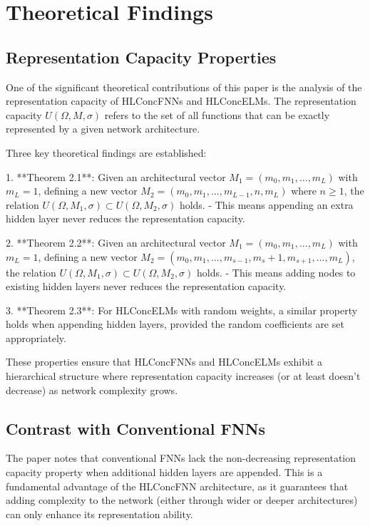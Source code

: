 \documentclass[11pt,a4paper]{article}
\begin{document}
\section{Theoretical Findings}

\subsection{Representation Capacity Properties}

One of the significant theoretical contributions of this paper is the analysis of the representation capacity of HLConcFNNs and HLConcELMs. The representation capacity $U(\Omega, M, \sigma)$ refers to the set of all functions that can be exactly represented by a given network architecture.

Three key theoretical findings are established:

1. **Theorem 2.1**: Given an architectural vector $M_1 = (m_0, m_1, ..., m_L)$ with $m_L = 1$, defining a new vector $M_2 = (m_0, m_1, ..., m_{L-1}, n, m_L)$ where $n \geq 1$, the relation $U(\Omega, M_1, \sigma) \subset U(\Omega, M_2, \sigma)$ holds.
   - This means appending an extra hidden layer never reduces the representation capacity.

2. **Theorem 2.2**: Given an architectural vector $M_1 = (m_0, m_1, ..., m_L)$ with $m_L = 1$, defining a new vector $M_2 = (m_0, m_1, ..., m_{s-1}, m_s+1, m_{s+1}, ..., m_L)$, the relation $U(\Omega, M_1, \sigma) \subset U(\Omega, M_2, \sigma)$ holds.
   - This means adding nodes to existing hidden layers never reduces the representation capacity.

3. **Theorem 2.3**: For HLConcELMs with random weights, a similar property holds when appending hidden layers, provided the random coefficients are set appropriately.

These properties ensure that HLConcFNNs and HLConcELMs exhibit a hierarchical structure where representation capacity increases (or at least doesn't decrease) as network complexity grows.

\subsection{Contrast with Conventional FNNs}

The paper notes that conventional FNNs lack the non-decreasing representation capacity property when additional hidden layers are appended. This is a fundamental advantage of the HLConcFNN architecture, as it guarantees that adding complexity to the network (either through wider or deeper architectures) can only enhance its representation ability.
\end{document}
